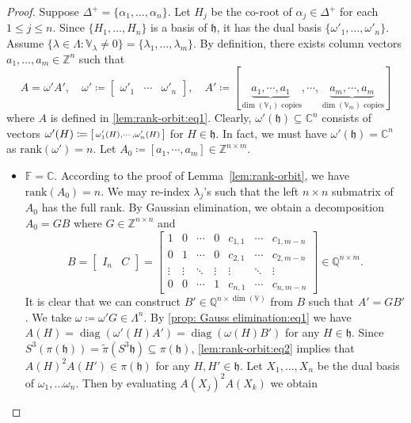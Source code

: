 \documentclass[10pt,a4paper]{amsart}
\DeclareMathOperator{\diag}{diag}
\newcommand{\CC}{\mathbb{C}} %
\newcommand{\FF}{\mathbb{F}} %
\newcommand{\rank}{\mathrm{rank}} %
\begin{document}
\begin{proof}
Suppose $\Delta^+ = \{\alpha_1,\dots,  \alpha_n\}$.  Let $H_j$ be the co-root of $\alpha_j \in \Delta^+$ for each $1 \le j \le n $.  Since $\{H_1,\dots,  H_n\}$ is a basis of $\mathfrak{h}$,  it has the dual basis $\{\omega'_1,\dots,  \omega'_n\}$.  Assume $\{\lambda\in \Lambda: \mathbb{V}_{\lambda} \ne 0\}= \{ \lambda_1,  \dots,  \lambda_m \}$.  By definition,  there exists column vectors $a_1,\dots,  a_m \in \mathbb{Z}^{n}$ such that 
\begin{equation}\label{prop: Gauss elimination:eq1}
A =  \omega'  A',  \quad \omega'\coloneqq  \begin{bmatrix}
\omega'_1 &
\cdots &
\omega'_n
\end{bmatrix},\quad A' \coloneqq [
\underbrace{a_1,  \cdots,  a_1}_{\dim(\mathbb{V}_1) \text{~copies}},  \cdots,  \underbrace{a_m,  \cdots,  a_m}_{\dim(\mathbb{V}_m) \text{~copies}} ]
\end{equation}
where $A$ is defined in \eqref{lem:rank-orbit:eq1}.  Clearly,  $\omega'(\mathfrak{h}) \subseteq \mathbb{C}^n$ consists of vectors $\omega'(H) \coloneqq \begin{bsmallmatrix} \omega'_1(H),\cdots,  \omega'_n(H)
\end{bsmallmatrix}$ for $H\in \mathfrak{h}$.  In fact,  we must have $\omega'(\mathfrak{h}) = \mathbb{C}^n$ as $\rank (\omega') = n$.  Let $A_0 \coloneqq [
a_1, \cdots,  a_m] \in \mathbb{Z}^{n \times m}$.
\begin{itemize}
\item[$\diamond$] $\FF=\CC$.  According to the proof of Lemma~\ref{lem:rank-orbit},  we have $\rank(A_0) = n$.  We may re-index $\lambda_j$'s such that the left $n\times n$ submatrix of $A_0$ has the full rank.  By Gaussian elimination,  we obtain a decomposition $A_0 = GB$ where $G \in \mathbb{Z}^{n\times n}$ and 
\[
B = \begin{bmatrix}
I_n & C 
\end{bmatrix} = \begin{bmatrix} 
1 & 0 & \cdots & 0 & c_{1,1} & \cdots & c_{1,m-n} \\
0 & 1 & \cdots & 0 & c_{2,1} & \cdots & c_{2,m-n} \\
\vdots & \vdots & \ddots & \vdots & \vdots & \ddots & \vdots \\
0 & 0 & \cdots & 1 & c_{n,1} & \cdots & c_{n,m-n}
\end{bmatrix} \in \mathbb{Q}^{n \times m}.
\]
It is clear that we can construct $B' \in \mathbb{Q}^{n \times \dim (\mathbb{V})}$ from $B$ such that $A' = G B'$.  We take $\omega \coloneqq \omega' G \in \Lambda^n$.  By \eqref{prop: Gauss elimination:eq1} we have $A(H) = \diag ( \omega'(H) A' ) =  \diag ( \omega(H) B' )$ for any $H\in \mathfrak{h}$.  Since $S^3 \left( \pi(\mathfrak{h}) \right) = \widetilde{\pi} \left( S^3 \mathfrak{h}\right)\subseteq \pi(\mathfrak{h})$,  \eqref{lem:rank-orbit:eq2} implies that $A(H)^2 A(H') \in \pi (\mathfrak{h})$ for any $H,H'\in \mathfrak{h}$.  Let $X_1,\dots,  X_n$ be the dual basis of $\omega_1,\dots  \omega_n$.  Then by evaluating $A(X_j)^2 A(X_k)$ we obtain 

\end{itemize}
\end{proof}
\end{document}
